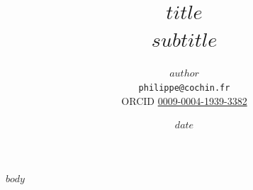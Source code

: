 \documentclass[11pt,a4paper]{article}
\title{$title$\\[0.5em]{\large $subtitle$}}
\author{$author$ \\ \texttt{philippe@cochin.fr} \\
  \small ORCID \href{https://orcid.org/0009-0004-1939-3382}{0009-0004-1939-3382}}
\date{$date$}
\begin{document}
\maketitle
$body$
\end{document}

